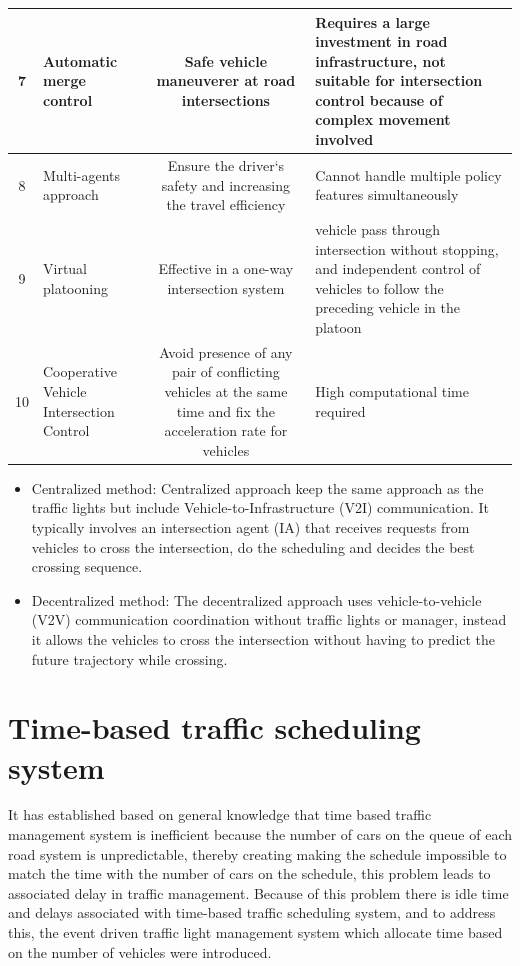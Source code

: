 \documentclass{book}
\begin{document}
\begin{table}
\begin{tabular}{|c|l|c|l|}
  7 & \multicolumn{1}{m{3cm}|}{Automatic merge control} & \multicolumn{1}{m{4cm}|}{Safe vehicle maneuverer at road intersections} & \multicolumn{1}{m{4cm}|}{Requires a large investment in road infrastructure, not suitable for intersection control because of complex movement involved }\\\hline
  8 & \multicolumn{1}{m{3cm}|}{Multi-agents approach} & \multicolumn{1}{m{4cm}|}{Ensure the driver‘s safety and increasing the travel efficiency} & \multicolumn{1}{m{4cm}|}{Cannot handle multiple policy features simultaneously }\\\hline
  9 & \multicolumn{1}{m{3cm}|}{Virtual platooning} & \multicolumn{1}{m{4cm}|}{Effective in a one-way intersection system} & \multicolumn{1}{m{4cm}|}{vehicle pass through intersection without stopping, and independent control of vehicles to follow the preceding vehicle in the platoon}\\\hline
  10 & \multicolumn{1}{m{3cm}|}{Cooperative Vehicle Intersection Control} & \multicolumn{1}{m{4cm}|}{Avoid presence of any pair of conflicting vehicles at the same time and fix the acceleration rate for vehicles} & \multicolumn{1}{m{4cm}|}{High computational time required}\\\hline
\end{tabular}
\end{table}


\begin{itemize}
    \item Centralized method: Centralized approach keep the
same approach as the traffic lights but include Vehicle-to-Infrastructure (V2I) communication. It  typically involves an intersection agent (IA)
that receives requests from vehicles to cross the intersection, do the scheduling and decides the best crossing sequence. \cite{dresner2006traffic}
    \item Decentralized method: The decentralized approach uses vehicle-to-vehicle (V2V) communication coordination without traffic
lights or manager, instead it allows the vehicles to cross the intersection without having to predict the future trajectory while crossing.
\end{itemize}

\section{Time-based traffic scheduling system}
It has established based on general knowledge that time based traffic management system is inefficient because the number of cars on the queue of each road system is unpredictable, thereby creating making the schedule impossible to match the time with the number of cars on the schedule, this problem leads to associated delay in traffic management. Because of this problem there is idle time and delays associated with time-based traffic scheduling system, and to address this, the event driven traffic light management system which allocate time based on the number of vehicles were introduced.
\end{document}
